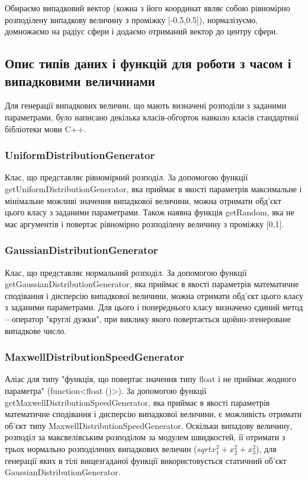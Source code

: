 \documentclass[a4paper,12pt]{article}
\begin{document}
Обираємо випадковий вектор (кожна з його координат являє собою рівномірно розподілену випадкову величину з проміжку [-0.5,0.5]), нормалізуємо, домножаємо на радіус сфери і додаємо отриманий вектор до центру сфери.


\subsection{Опис типів даних і функцій для роботи з часом і випадковими величинами}
Для генерації випадкових величин, що мають визначені розподіли з заданими параметрами, було написано декілька класів-обгорток навколо класів стандартної бібліотеки мови C++.

\subsubsection{UniformDistributionGenerator}
Клас, що представляє рівномірний розподіл. За допомогою функції getUniformDistributionGenerator, яка приймає в якості параметрів максимальне і мінімальне можливі значення випадкової величини, можна отримати обд’єкт цього класу з заданими параметрами. Також наявна функція getRandom, яка не має аргументів і повертає рівномірно розподілену величину з проміжку [0,1].

\subsubsection{GaussianDistributionGenerator}
Клас, що представляє нормальний розподіл. За допомогою функції getGaussianDistributionGenerator, яка приймає в якості параметрів математичне сподівання і дисперсію випадкової величини, можна отримати обд’єкт цього класу з заданими параметрами. Для цього і попереднього класу визначено єдиний метод -- оператор "круглі дужки", при виклику якого повертається щойно-згенероване випадкове число.

\subsubsection{MaxwellDistributionSpeedGenerator}
Аліас для типу "функція, що повертає значення типу float і не приймає жодного параметра" (function<float ()>). За допомогою функції getMaxwellDistributionSpeedGenerator, яка приймає в якості параметрів математичне сподівання і дисперсію випадкової величини, є можливість отримати об’єкт типу MaxwellDistributionSpeedGenerator. Оскільки випадову величину, розподіл за максвелівським розподілом за модулем швидкостей, її отримати з трьох нормально розподілених випадкових величин ($sqrt{x_1^2 + x_2^2 + x_3^2}$), для генерації яких в тілі вищезгаданої функції використовується статичний об’єкт GaussianDistributionGenerator.
\end{document}

